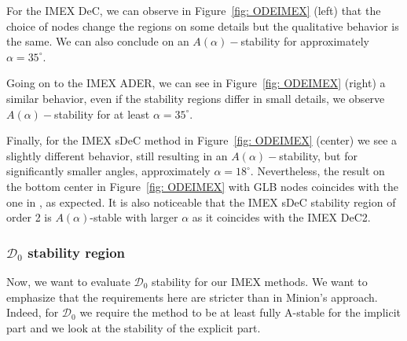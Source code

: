 For the IMEX DeC, we can observe in Figure~\ref{fig: ODEIMEX} (left) that the choice of nodes change the regions on some details but the qualitative behavior is the same. We can also conclude on an $A(\alpha)-$stability for approximately $\alpha=35^\circ$.

Going on to the IMEX ADER, we can see in Figure~\ref{fig: ODEIMEX} (right) a similar behavior, even if the stability regions differ in small details, we observe $A(\alpha)-$stability for at least $\alpha=35^\circ$.

Finally, for the IMEX sDeC method in Figure~\ref{fig: ODEIMEX} (center) we see a slightly different behavior, still resulting in an $A(\alpha)-$stability, but for significantly smaller angles, approximately $\alpha=18^\circ$. 
Nevertheless, the result on the bottom center in Figure~\ref{fig: ODEIMEX} with GLB nodes coincides with the one in \cite{minion2003dec}, as expected. 
It is also noticeable that the IMEX sDeC stability region of order 2 is $A(\alpha)$-stable with larger $\alpha$ as it coincides with the IMEX DeC2.


\subsubsection*{$\mathcal{D}_0$ stability region}

Now, we want to evaluate $\mathcal{D}_0$ stability for our IMEX methods. 
We want to emphasize that the requirements here are stricter than in Minion's approach. 
Indeed, for $\mathcal{D}_0$ we require the method to be at least fully A-stable for the implicit part and we look at the stability of the explicit part.


